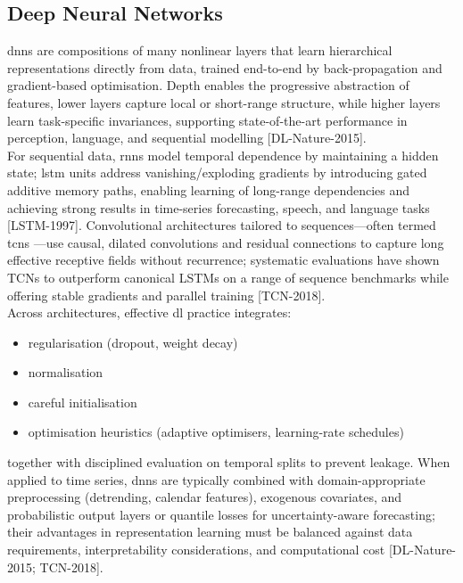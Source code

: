 \subsection{Deep Neural Networks}

\acrfull{dnns} are compositions of many nonlinear layers that learn hierarchical representations directly from data, trained end-to-end by back-propagation and gradient-based optimisation. Depth enables the progressive abstraction of features, lower layers capture local or short-range structure, while higher layers learn task-specific invariances, supporting state-of-the-art performance in perception, language, and sequential modelling [DL-Nature-2015].\\

For sequential data, \acrfull{rnns} model temporal dependence by maintaining a hidden state; \acrfull{lstm} units address vanishing/exploding gradients by introducing gated additive memory paths, enabling learning of long-range dependencies and achieving strong results in time-series forecasting, speech, and language tasks [LSTM-1997]. Convolutional architectures tailored to sequences—often termed 
\acrfull{tcns}
—use causal, dilated convolutions and residual connections to capture long effective receptive fields without recurrence; systematic evaluations have shown TCNs to outperform canonical LSTMs on a range of sequence benchmarks while offering stable gradients and parallel training [TCN-2018]. \\


Across architectures, effective \acrshort{dl} practice integrates:

\begin{itemize}
    \item regularisation (dropout, weight decay)
    \item normalisation
    \item careful initialisation
    \item optimisation heuristics (adaptive optimisers, learning-rate schedules)
\end{itemize}

 together with disciplined evaluation on temporal splits to prevent leakage. When applied to time series, \acrshort{dnns} are typically combined with domain-appropriate preprocessing (detrending, calendar features), exogenous covariates, and probabilistic output layers or quantile losses for uncertainty-aware forecasting; their advantages in representation learning must be balanced against data requirements, interpretability considerations, and computational cost [DL-Nature-2015; TCN-2018].

